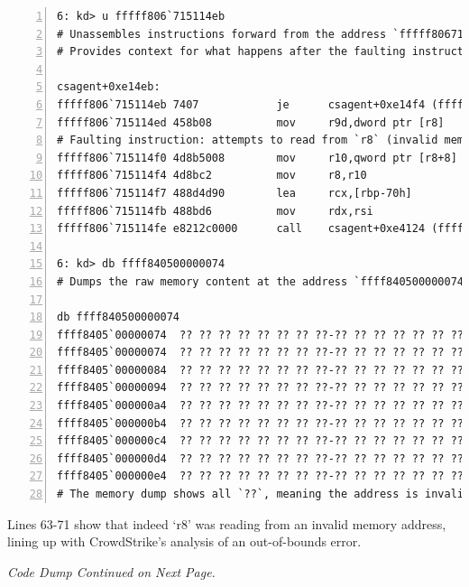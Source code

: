 \begin{lstlisting}[caption=Debugging csagent.sys Module (\# comments), numbers=left]
6: kd> u fffff806`715114eb
# Unassembles instructions forward from the address `fffff806715114eb`.
# Provides context for what happens after the faulting instruction.

csagent+0xe14eb:
fffff806`715114eb 7407            je      csagent+0xe14f4 (fffff806715114f4)
fffff806`715114ed 458b08          mov     r9d,dword ptr [r8]
# Faulting instruction: attempts to read from `r8` (invalid memory).
fffff806`715114f0 4d8b5008        mov     r10,qword ptr [r8+8]
fffff806`715114f4 4d8bc2          mov     r8,r10
fffff806`715114f7 488d4d90        lea     rcx,[rbp-70h]
fffff806`715114fb 488bd6          mov     rdx,rsi
fffff806`715114fe e8212c0000      call    csagent+0xe4124 (fffff80671514124)

6: kd> db ffff840500000074
# Dumps the raw memory content at the address `ffff840500000074`.

db ffff840500000074
ffff8405`00000074  ?? ?? ?? ?? ?? ?? ?? ??-?? ?? ?? ?? ?? ?? ?? ??...
ffff8405`00000074  ?? ?? ?? ?? ?? ?? ?? ??-?? ?? ?? ?? ?? ?? ?? ??...
ffff8405`00000084  ?? ?? ?? ?? ?? ?? ?? ??-?? ?? ?? ?? ?? ?? ?? ??...
ffff8405`00000094  ?? ?? ?? ?? ?? ?? ?? ??-?? ?? ?? ?? ?? ?? ?? ??...
ffff8405`000000a4  ?? ?? ?? ?? ?? ?? ?? ??-?? ?? ?? ?? ?? ?? ?? ??...
ffff8405`000000b4  ?? ?? ?? ?? ?? ?? ?? ??-?? ?? ?? ?? ?? ?? ?? ??...
ffff8405`000000c4  ?? ?? ?? ?? ?? ?? ?? ??-?? ?? ?? ?? ?? ?? ?? ??...
ffff8405`000000d4  ?? ?? ?? ?? ?? ?? ?? ??-?? ?? ?? ?? ?? ?? ?? ??...
ffff8405`000000e4  ?? ?? ?? ?? ?? ?? ?? ??-?? ?? ?? ?? ?? ?? ?? ??...
# The memory dump shows all `??`, meaning the address is invalid or not mapped.
\end{lstlisting}

\vspace{2em}
\noindent
Lines 63-71 show that indeed `r8' was reading from an invalid memory address, lining up
with CrowdStrike's analysis of an out-of-bounds error.

\vfill
\begin{center}
    \textit{Code Dump Continued on Next Page.}
\end{center}
\vfill

\newpage


